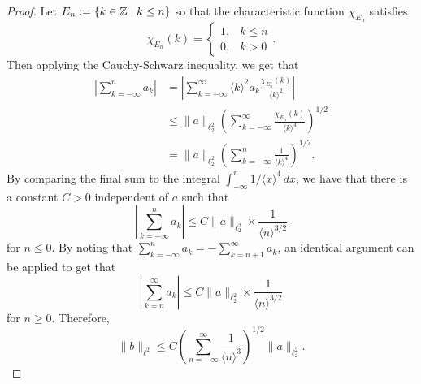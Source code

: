 \elltwo*
\begin{proof}
	Let \(E_n := \{k \in \mathbb{Z} \mid k \leq n\}\) so that the characteristic function \(\chi_{E_n}\) satisfies
	\begin{equation}
		\chi_{E_n}(k) = \begin{cases}1, & k \leq n \\ 0, & k > 0\end{cases}.
	\end{equation}
	Then applying the Cauchy-Schwarz inequality, we get that
	\begin{align*}
		\left| \sum_{k=-\infty}^n a_k \right| &= \left| \sum_{k=-\infty}^\infty \langle k\rangle ^2a_k \frac{\chi_{E_n}(k)}{\langle k \rangle^2} \right|  \\
		&\leq \| a\|_{\ell^2_2} \left( \sum_{k=-\infty}^\infty \frac{\chi_{E_n}(k)}{\langle k \rangle^4}\right)^{1/2} \\
		&= \| a\|_{\ell^2_2} \left( \sum_{k=-\infty}^n \frac{1}{\langle k \rangle^4}\right)^{1/2}.
	\end{align*}
	By comparing the final sum to the integral \(\int_{-\infty}^n 1/ \langle x\rangle^4 \, dx\), we have that there is a constant \(C>0\) independent of \(a\) such that
	\begin{equation}
		\left| \sum_{k=-\infty}^n a_k \right|  \leq C \| a\|_{\ell^2_2} \times \frac 1 {\langle n\rangle^{3/2}}
	\end{equation}
	for \(n\leq 0\). By noting that \(\sum_{k=-\infty}^n a_k = -\sum_{k=n+1}^\infty a_k\), an identical argument can be applied to get that 
	\begin{equation}
		\left| \sum_{k=n}^\infty a_k \right|  \leq C \| a\|_{\ell^2_2} \times \frac 1 {\langle n\rangle ^{3/2}}
	\end{equation}
	for \(n \geq 0\). Therefore,
	\begin{equation}
		\|b \|_{\ell^2} \leq C \left( \sum_{n=-\infty}^\infty \frac{1}{\langle n\rangle^{3}}\right)^{1/2} \| a \|_{\ell^2_2}.
	\end{equation}
\end{proof}